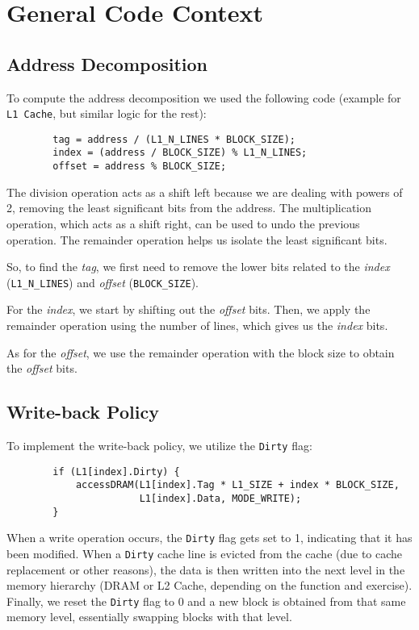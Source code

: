 \documentclass[12pt]{article}
\begin{document}
    \section{General Code Context}

    \subsection{Address Decomposition} \label{AD}
    To compute the address decomposition we used the following code (example for \texttt{L1 Cache}, but similar logic for the rest):

    \begin{verbatim}
        tag = address / (L1_N_LINES * BLOCK_SIZE);
        index = (address / BLOCK_SIZE) % L1_N_LINES;
        offset = address % BLOCK_SIZE;
    \end{verbatim}

    \vskip -0.3cm
    The division operation acts as a shift left because we are dealing with powers of 2, removing the least significant bits from the address.
    The multiplication operation, which acts as a shift right, can be used to undo the previous operation. The remainder operation helps
    us isolate the least significant bits.

    So, to find the \textit{tag}, we first need to remove the lower bits related to the \textit{index} (\texttt{L1\_N\_LINES}) and \textit{offset} (\texttt{BLOCK\_SIZE}).

    For the \textit{index}, we start by shifting out the \textit{offset} bits. Then, we apply the remainder operation using the number of lines,
    which gives us the \textit{index} bits.

    As for the \textit{offset}, we use the remainder operation with the block size to obtain the \textit{offset} bits.

    \subsection{Write-back Policy} \label{WBP}
    To implement the write-back policy, we utilize the \texttt{Dirty} flag:

    \begin{verbatim}
        if (L1[index].Dirty) {
            accessDRAM(L1[index].Tag * L1_SIZE + index * BLOCK_SIZE,
                       L1[index].Data, MODE_WRITE);
        }
    \end{verbatim}

    \vskip -0.3cm
    When a write operation occurs, the \texttt{Dirty} flag gets set to 1, indicating that it has been modified.
    When a \texttt{Dirty} cache line is evicted from the cache (due to cache replacement or other reasons),
    the data is then written into the next level in the memory hierarchy (DRAM or L2 Cache, depending on the function and exercise).
    Finally, we reset the \texttt{Dirty} flag to 0 and a new block is obtained from that same memory level, essentially swapping blocks with that level.
\end{document}
